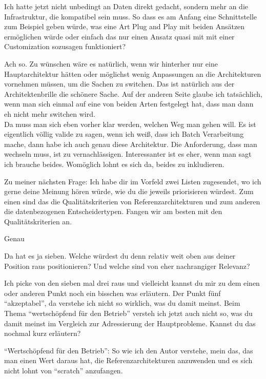 \LF	 Ich hatte jetzt nicht unbedingt an Daten direkt gedacht, sondern mehr an die Infrastruktur, die kompatibel sein muss. So dass es am Anfang eine Schnittstelle zum Beispiel geben würde, was eine Art Plug and Play mit beiden Ansätzen ermöglichen würde oder einfach das nur einen Ansatz quasi mit mit einer Customization sozusagen funktioniert?

\PA	Ach so. Zu wünschen wäre es natürlich, wenn wir hinterher nur eine Hauptarchitektur hätten oder möglichst wenig Anpassungen an die Architekturen vornehmen müssen, um die Sachen zu switchen. Das ist natürlich aus der Architektenbrille die schönere Sache. Auf der anderen Seite glaube ich tatsächlich, wenn man sich einmal auf eine von beiden Arten festgelegt hat, dass man dann eh nicht mehr switchen wird. \\
Da muss man sich eben vorher klar werden, welchen Weg man gehen will. Es ist eigentlich völlig valide zu sagen, wenn ich weiß, dass ich Batch Verarbeitung mache, dann habe ich auch genau diese Architektur. Die Anforderung, dass man wechseln muss, ist zu vernachlässigen. Interessanter ist es eher, wenn man sagt ich brauche beides. Womöglich lohnt es sich da, beides zu inkludieren.

\LF	 Zu meiner nächsten Frage: Ich habe dir im Vorfeld zwei Listen zugesendet, wo ich gerne deine Meinung hören würde, wie du die jeweils priorisieren würdest. Zum einen sind das die Qualitätskriterien von Referenzarchitekturen und zum anderen die datenbezogenen Entscheidertypen. Fangen wir am besten mit den Qualitätskriterien an.

\PA	 Genau

\LF	Da hat es ja sieben. Welche würdest du denn relativ weit oben aus deiner Position raus positionieren? Und welche sind von eher nachrangiger Relevanz?

\PA	Ich picke von den sieben mal drei raus und vielleicht kannst du mir zu dem einen oder anderen Punkt noch ein bisschen was erläutern. Der Punkt fünf \enquote{akzeptabel}, da verstehe ich nicht so wirklich, was du damit meinst. Beim  Thema \enquote{wertschöpfend für den Betrieb} versteh ich jetzt auch nicht so, was du damit meinst im Vergleich zur Adressierung der Hauptprobleme. Kannst du das nochmal kurz erläutern?

\LF	\enquote{Wertschöpfend für den Betrieb}: So wie ich den Autor verstehe, mein das, das man einen Wert daraus hat, die Referenzarchitekturen anzuwenden und es sich nicht lohnt von \enquote{scratch} anzufangen.

